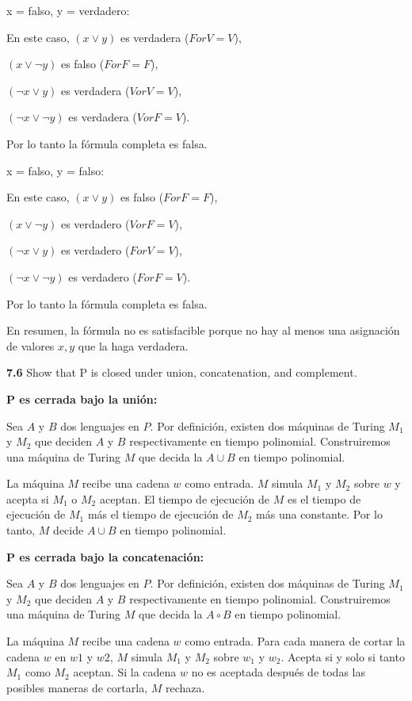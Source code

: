 \documentclass{article}
\begin{document}
    x = falso, y = verdadero:
    
    En este caso, 
    $ (x \lor y)$ es verdadera ($F or V = V$),

    $(x \lor \neg{y})$ es falso ($F or F = F$),

    $(\neg{x} \lor y)$ es verdadera ($V or V = V$),

    $(\neg{x} \lor \neg{y})$ es verdadera ($V or F = V$).

    Por lo tanto la fórmula completa es falsa.

    x = falso, y = falso:

    En este caso, 
    $ (x \lor y)$ es falso ($F or F = F$),

    $(x \lor \neg{y})$ es verdadero ($V or F = V$),

    $(\neg{x} \lor y)$ es verdadero ($F or V = V$),

    $(\neg{x} \lor \neg{y})$ es verdadero ($F or F = V$).

    Por lo tanto la fórmula completa es falsa.
    

En resumen, la fórmula no es satisfacible porque no hay al menos una asignación
de valores $x,y$ que la haga verdadera.

\textbf{7.6} Show that P is closed under union, concatenation, and complement.

\textbf{P es cerrada bajo la unión:}

Sea $A$ y $B$ dos lenguajes en $P$. Por definición, existen dos máquinas de
Turing $M_1$ y $M_2$ que deciden $A$ y $B$ respectivamente en tiempo polinomial.
Construiremos una máquina de Turing $M$ que decida la $A \cup B$ en tiempo
polinomial.

La máquina $M$ recibe una cadena $w$ como entrada. $M$ simula $M_1$ y $M_2$
sobre $w$ y acepta si $M_1$ o $M_2$ aceptan. El tiempo de ejecución de $M$ es
el tiempo de ejecución de $M_1$ más el tiempo de ejecución de $M_2$ más una
constante. Por lo tanto, $M$ decide $A \cup B$ en tiempo polinomial.

\textbf{P es cerrada bajo la concatenación:}

Sea $A$ y $B$ dos lenguajes en $P$. Por definición, existen dos máquinas de
Turing $M_1$ y $M_2$ que deciden $A$ y $B$ respectivamente en tiempo polinomial.
Construiremos una máquina de Turing $M$ que decida la $A \circ B$ en tiempo
polinomial.

La máquina $M$ recibe una cadena $w$ como entrada. Para cada manera de cortar la
cadena $w$ en $w1$ y $w2$, $M$ simula $M_1$ y $M_2$ sobre $w_1$ y $w_2$. Acepta
si y solo si tanto $M_1$ como $M_2$ aceptan. Si la cadena $w$ no es aceptada
después de todas las posibles maneras de cortarla, $M$ rechaza.
\end{document}
